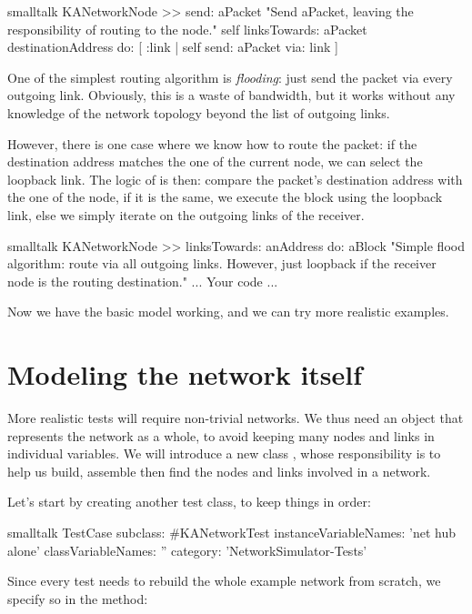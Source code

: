 \documentclass[10pt,twoside,english]{_support/latex/sbabook/sbabook}
\begin{document}
\begin{displaycode}{smalltalk}
KANetworkNode >> send: aPacket
    "Send aPacket, leaving the responsibility of routing to the node."
    self
        linksTowards: aPacket destinationAddress
        do: [ :link | self send: aPacket via: link ]
\end{displaycode}

One of the simplest routing algorithm is \textit{flooding}: just send the packet via every outgoing link.
Obviously, this is a waste of bandwidth, but it works without any knowledge of the network topology beyond the list of outgoing links.

However, there is one case where we know how to route the packet: if the destination address matches the one of the current node, we can select the loopback link.
The logic of  is then: compare the packet's destination address with the one of the node, if it is the same, we execute the block using the loopback link, else we simply iterate on the outgoing links of the receiver.

\begin{displaycode}{smalltalk}
KANetworkNode >> linksTowards: anAddress do: aBlock
    "Simple flood algorithm: route via all outgoing links.
    However, just loopback if the receiver node is the routing destination."
    ... Your code ...
\end{displaycode}

Now we have the basic model working, and we can try more realistic examples.
\section{Modeling the network itself}
More realistic tests will require non-trivial networks.
We thus need an object that represents the network as a whole, to avoid keeping many nodes and links in individual variables.
We will introduce a new class , whose responsibility is to help us build, assemble then find the nodes and links involved in a network.

Let's start by creating another test class, to keep things in order:

\begin{displaycode}{smalltalk}
TestCase subclass: #KANetworkTest
    instanceVariableNames: 'net hub alone'
    classVariableNames: ''
    category: 'NetworkSimulator-Tests'
\end{displaycode}

Since every test needs to rebuild the whole example network from scratch, we specify so in the  method:
\end{document}
